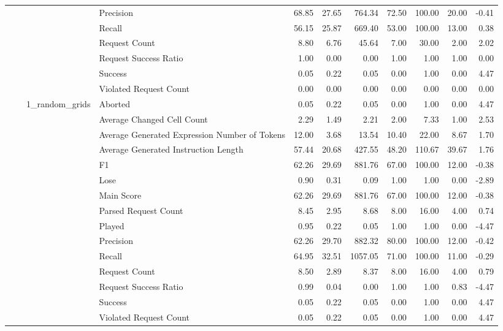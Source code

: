 \begin{tabular}{llllrrrrrrr}
 &  &  & Precision & 68.85 & 27.65 & 764.34 & 72.50 & 100.00 & 20.00 & -0.41 \\
 &  &  & Recall & 56.15 & 25.87 & 669.40 & 53.00 & 100.00 & 13.00 & 0.38 \\
 &  &  & Request Count & 8.80 & 6.76 & 45.64 & 7.00 & 30.00 & 2.00 & 2.02 \\
 &  &  & Request Success Ratio & 1.00 & 0.00 & 0.00 & 1.00 & 1.00 & 1.00 & 0.00 \\
 &  &  & Success & 0.05 & 0.22 & 0.05 & 0.00 & 1.00 & 0.00 & 4.47 \\
 &  &  & Violated Request Count & 0.00 & 0.00 & 0.00 & 0.00 & 0.00 & 0.00 & 0.00 \\
\cline{3-11}
 &  & \multirow[t]{15}{*}{1_random_grids} & Aborted & 0.05 & 0.22 & 0.05 & 0.00 & 1.00 & 0.00 & 4.47 \\
 &  &  & Average Changed Cell Count & 2.29 & 1.49 & 2.21 & 2.00 & 7.33 & 1.00 & 2.53 \\
 &  &  & Average Generated Expression Number of Tokens & 12.00 & 3.68 & 13.54 & 10.40 & 22.00 & 8.67 & 1.70 \\
 &  &  & Average Generated Instruction Length & 57.44 & 20.68 & 427.55 & 48.20 & 110.67 & 39.67 & 1.76 \\
 &  &  & F1 & 62.26 & 29.69 & 881.76 & 67.00 & 100.00 & 12.00 & -0.38 \\
 &  &  & Lose & 0.90 & 0.31 & 0.09 & 1.00 & 1.00 & 0.00 & -2.89 \\
 &  &  & Main Score & 62.26 & 29.69 & 881.76 & 67.00 & 100.00 & 12.00 & -0.38 \\
 &  &  & Parsed Request Count & 8.45 & 2.95 & 8.68 & 8.00 & 16.00 & 4.00 & 0.74 \\
 &  &  & Played & 0.95 & 0.22 & 0.05 & 1.00 & 1.00 & 0.00 & -4.47 \\
 &  &  & Precision & 62.26 & 29.70 & 882.32 & 80.00 & 100.00 & 12.00 & -0.42 \\
 &  &  & Recall & 64.95 & 32.51 & 1057.05 & 71.00 & 100.00 & 11.00 & -0.29 \\
 &  &  & Request Count & 8.50 & 2.89 & 8.37 & 8.00 & 16.00 & 4.00 & 0.79 \\
 &  &  & Request Success Ratio & 0.99 & 0.04 & 0.00 & 1.00 & 1.00 & 0.83 & -4.47 \\
 &  &  & Success & 0.05 & 0.22 & 0.05 & 0.00 & 1.00 & 0.00 & 4.47 \\
 &  &  & Violated Request Count & 0.05 & 0.22 & 0.05 & 0.00 & 1.00 & 0.00 & 4.47 \\
\cline{2-11} \cline{3-11}

\end{tabular}
